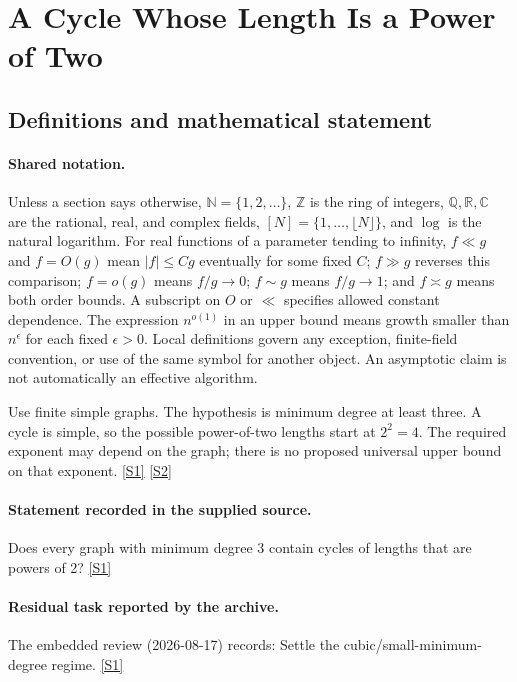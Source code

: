 \documentclass[11pt,a4paper]{article}
\newcommand{\N}{\mathbb{N}}
\newcommand{\Z}{\mathbb{Z}}
\newcommand{\Q}{\mathbb{Q}}
\newcommand{\R}{\mathbb{R}}
\newcommand{\C}{\mathbb{C}}
\newcommand{\sref}[2]{\hyperlink{source:#1:#2}{[S#2]}}
\begin{document}
\section{A Cycle Whose Length Is a Power of Two}\label{statement}


\subsection{Definitions and mathematical statement}

\paragraph{Shared notation.}Unless a section says otherwise, $\N=\{1,2,\ldots\}$,
$\Z$ is the ring of integers, $\Q,\R,\C$ are the rational, real, and complex
fields, $[N]=\{1,\ldots,\lfloor N\rfloor\}$, and $\log$ is the natural
logarithm. For real functions of a parameter tending to infinity,
$f\ll g$ and $f=O(g)$ mean $|f|\leq Cg$ eventually for some fixed $C$;
$f\gg g$ reverses this comparison; $f=o(g)$ means $f/g\to0$;
$f\sim g$ means $f/g\to1$; and $f\asymp g$ means both order bounds.
A subscript on $O$ or $\ll$ specifies allowed constant dependence.
The expression $n^{o(1)}$ in an upper bound means growth smaller than
$n^\epsilon$ for each fixed $\epsilon>0$. Local definitions govern any
exception, finite-field convention, or use of the same symbol for another
object. An asymptotic claim is not automatically an effective algorithm.



Use finite simple graphs. The hypothesis is minimum degree at least three. A cycle is simple, so the possible power-of-two lengths start at $2^2=4$. The required exponent may depend on the graph; there is no proposed universal upper bound on that exponent. \sref{statement}{1} \sref{statement}{2}

\paragraph{Statement recorded in the supplied source.}
Does every graph with minimum degree 3 contain cycles of lengths that are powers of 2? \sref{statement}{1}

\paragraph{Residual task reported by the archive.}

The embedded review (2026-08-17) records: Settle the cubic/small-minimum-degree regime. \sref{statement}{1}
\end{document}
